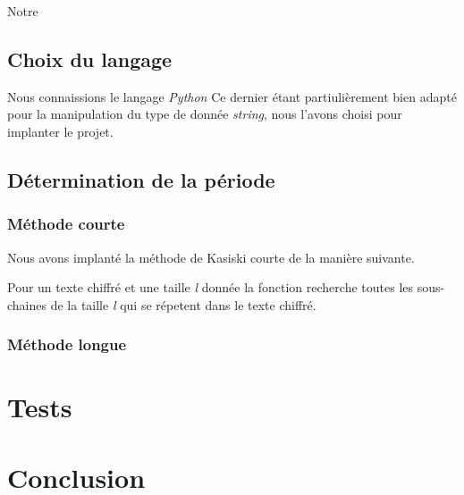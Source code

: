 \documentclass[a4paper, 11pt]{article}
\begin{document}
Notre


\subsection{Choix du langage}
Nous connaissions le langage \textit{Python}
Ce dernier étant partiulièrement bien adapté pour la manipulation
du type de donnée \textit{string}, nous l'avons choisi pour implanter
le projet.

\subsection{Détermination de la période}
\subsubsection{Méthode courte}
Nous avons implanté la méthode de Kasiski courte de la manière
suivante.

Pour un texte chiffré et une taille \textit{l} donnée la fonction recherche toutes
les sous-chaines de la taille \textit{l} qui se répetent dans le texte chiffré.
\subsubsection{Méthode longue}


\section{Tests}

\section{Conclusion}
\end{document}
